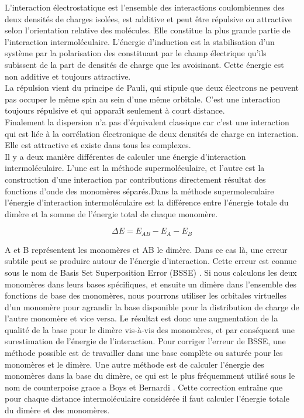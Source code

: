 L’interaction électrostatique est l’ensemble des interactions coulombiennes des deux densités de charges isolées, est additive et peut être répulsive ou attractive selon l’orientation relative des molécules. Elle constitue la plus grande partie de l’interaction intermoléculaire.  
L’énergie d’induction est la stabilisation d’un système par la polarisation des constituant par le champ électrique qu’ils subissent de la part de densités de charge que les avoisinant. Cette énergie est non additive et toujours attractive.\\

La répulsion vient du principe de Pauli, qui stipule que deux électrons ne peuvent pas occuper le même spin au sein d’une même orbitale. C’est une interaction toujours répulsive et qui apparaît seulement à court distance.\\

Finalement la dispersion n’a pas d’équivalent classique car c’est une interaction qui est liée à la corrélation électronique de deux densités de charge en interaction. Elle est attractive et existe dans tous les complexes.\\

Il y a deux manière différentes de calculer une énergie d’interaction intermoléculaire. L’une est la méthode supermoléculaire, et l’autre est la construction d’une interaction par contributions directement résultat des fonctions d’onde des monomères séparés.Dans la méthode supermoleculaire l’énergie d’interaction intermoléculaire est la différence entre l’énergie totale du dimère et la somme de l’énergie total de chaque monomère.


\begin{equation}
\Delta E = E_{AB} - E_{A} - E_{B} \label{eq2}
\end{equation}

A et B représentent les monomères et AB le dimère. Dans ce cas là, une erreur subtile peut se produire autour de l’énergie d’interaction. Cette erreur est connue sous le nom de Basis Set Superposition Error (BSSE) \cite{sherrill2010counterpoise}. Si nous calculons les deux monomères dans leurs bases spécifiques, et ensuite un dimère dans l’ensemble des fonctions de base des monomères, nous pourrons utiliser les orbitales virtuelles d’un monomère pour agrandir la base disponible pour la distribution de charge de l’autre monomère et vice versa. Le résultat est donc une augmentation de la qualité de la base pour le dimère vis-à-vis des monomères, et par conséquent une surestimation de l’énergie de l’interaction. Pour corriger l’erreur de BSSE, une méthode possible est de travailler dans une base complète ou saturée pour les monomères et le dimère. Une autre méthode est de calculer l’énergie des monomères dans la base du dimère, ce qui est le plus fréquemment utilisé sous le nom de counterpoise grace a Boys et Bernardi \cite{boys1970calculation}. Cette correction entraîne que pour chaque distance intermoléculaire considérée il faut calculer l’énergie totale du dimère et des monomères.\\

